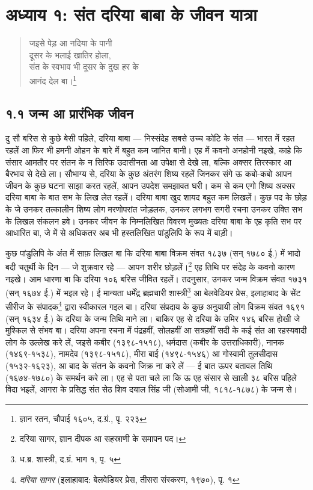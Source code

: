 \section*{अध्याय १: संत दरिया बाबा के जीवन यात्रा}

\begin{quote}
जइसे पेड़ आ नदिया के पानी\\
दूसर के भलाई खातिर होला,\\
संत के स्वभाव भी दूसर के दुख हर के\\
आनंद देल बा।\footnote{ज्ञान रतन, चौपाई १६०५, द.ग्रं., पृ. २२३}
\end{quote}

\subsection*{१.१ जन्म आ प्रारंभिक जीवन}

दु सौ बरिस से कुछे बेसी पहिले, दरिया बाबा — निस्संदेह सबसे उच्च कोटि के संत — भारत में रहत रहलें आ फिर भी हमनी ओहन के बारे में बहुत कम जानित बानी। एह में कवनो अनहोनी नइखे, काहे कि संसार आमतौर पर संतन के न सिरिफ उदासीनता आ उपेक्षा से देखे ला, बल्कि अक्सर तिरस्कार आ बैरभाव से देखे ला। सौभाग्य से, दरिया के कुछ अंतरंग शिष्य रहलें जिनकर संगे ऊ कबो-कबो आपन जीवन के कुछ घटना साझा करत रहलें, आपन उपदेश समझावत घरी। कम से कम एगो शिष्य अक्सर दरिया बाबा के बात सभ के लिख लेत रहलें। दरिया बाबा खुद शायद बहुत कम लिखलें। कुछ पद के छोड़ के जे उनकर तत्कालीन शिष्य लोग मरणोपरांत जोड़लक, उनकर लगभग सगरी रचना उनकर उक्ति सभ के लिखल संकलन हवे। उनकर जीवन के निम्नलिखित विवरण मुख्यतः दरिया बाबा के एह कृति सभ पर आधारित बा, जे में से अधिकतर अब भी हस्तलिखित पांडुलिपि के रूप में बाड़ी।

कुछ पांडुलिपि के अंत में साफ़ लिखल बा कि दरिया बाबा विक्रम संवत १८३७ (सन् १७८० ई.) में भादो बदी चतुर्थी के दिन — जे शुक्रवार रहे — आपन शरीर छोड़लें।\footnote{दरिया सागर, ज्ञान दीपक आ सहस्राणी के समापन पद।} एह तिथि पर संदेह के कवनो कारण नइखे। आम धारणा बा कि दरिया १०६ बरिस जीवित रहलें। तदनुसार, उनकर जन्म विक्रम संवत १७३१ (सन् १६७४ ई.) में भइल रहे। ई मान्यता धर्मेंद्र ब्रह्मचारी शास्त्री\footnote{ध.ब्र. शास्त्री, द.ग्रं. भाग १, पृ. ५} आ बेलवेडियर प्रेस, इलाहाबाद के सेंट सीरीज के संपादक\footnote{\textit{दरिया सागर} (इलाहाबाद: बेलवेडियर प्रेस, तीसरा संस्करण, १९७०), पृ. १} द्वारा स्वीकारल गइल बा। दरिया संप्रदाय के कुछ अनुयायी लोग विक्रम संवत १६९१ (सन् १६३४ ई.) के दरिया के जन्म तिथि माने ला। बाकिर एह से दरिया के उमिर १४६ बरिस होखी जे मुश्किल से संभव बा। दरिया अपना रचना में पंद्रहवीं, सोलहवीं आ सत्रहवीं सदी के कई संत आ रहस्यवादी लोग के उल्लेख करे लें, जइसे कबीर (१३९८-१५१८), धर्मदास (कबीर के उत्तराधिकारी), नानक (१४६९-१५३८), नामदेव (१३९८-१५१८), मीरा बाई (१४९८-१५४६) आ गोस्वामी तुलसीदास (१५३२-१६२३), आ बाद के संतन के कवनो जिक्र ना करे लें — ई बात ऊपर बतावल तिथि (१६७४-१७८०) के समर्थन करे ला। एह से पता चले ला कि ऊ एह संसार से खाली ३८ बरिस पहिले विदा भइलें, आगरा के प्रसिद्ध संत सेठ शिव दयाल सिंह जी (सोआमी जी, १८१८-१८७८) के जन्म से।


